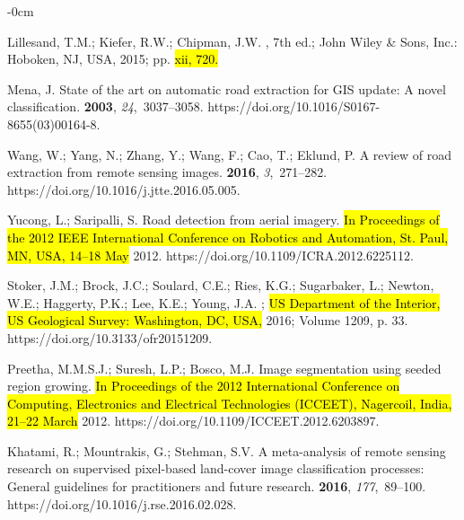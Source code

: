 \documentclass[remotesensing,article,accept,pdftex,moreauthors]{Definitions/mdpi}
\begin{document}
\begin{adjustwidth}{-\extralength}{0cm}
\begin{thebibliography}{999}
Lillesand, T.M.; Kiefer, R.W.; Chipman, J.W.
, 7th ed.;
  John Wiley \& Sons, Inc.: Hoboken, NJ, USA, 2015; pp. \hl{xii, 720.} %


Mena, J.
\newblock State of the art on automatic road extraction for GIS update: A novel
  classification.
 {\bf 2003}, {\em 24},~3037–3058.
\newblock https://doi.org/10.1016/S0167-8655(03)00164-8.

Wang, W.; Yang, N.; Zhang, Y.; Wang, F.; Cao, T.; Eklund, P.
\newblock A review of road extraction from remote sensing images.
 {\bf 2016}, {\em 3},~271--282.
\newblock https://doi.org/10.1016/j.jtte.2016.05.005.

Yucong, L.; Saripalli, S.
\newblock Road detection from aerial imagery. \hl{In Proceedings of the 2012 IEEE International Conference on Robotics and Automation, St. Paul, MN, USA, 14--18 May} 2012.
\newblock https://doi.org/10.1109/ICRA.2012.6225112.




Stoker, J.M.; Brock, J.C.; Soulard, C.E.; Ries, K.G.; Sugarbaker, L.; Newton, W.E.; Haggerty, P.K.; Lee, K.E.; Young, J.A.
; \hl{US Department of the Interior, US Geological Survey: Washington, DC, USA,} 2016; Volume 1209, p. 33. https://doi.org/10.3133/ofr20151209.

Preetha, M.M.S.J.; Suresh, L.P.; Bosco, M.J.
\newblock Image segmentation using seeded region growing. \hl{In Proceedings of the 2012 International Conference on Computing, Electronics and Electrical Technologies (ICCEET), Nagercoil, India, 21--22 March} 2012.
\newblock https://doi.org/10.1109/ICCEET.2012.6203897.

Khatami, R.; Mountrakis, G.; Stehman, S.V.
\newblock A meta-analysis of remote sensing research on supervised pixel-based
  land-cover image classification processes: General guidelines for
  practitioners and future research.
 {\bf 2016}, {\em 177},~89--100.
\newblock https://doi.org/10.1016/j.rse.2016.02.028.


\end{thebibliography}
\end{adjustwidth}
\end{document}
